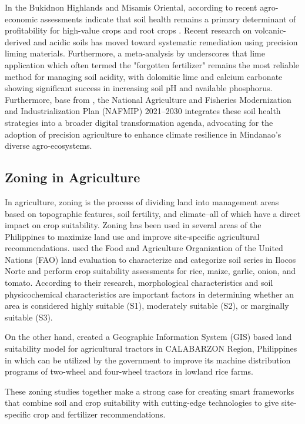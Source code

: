{	In the Bukidnon Highlands and Misamis Oriental, according to \cite{Octavio2024} recent agro-economic assessments indicate that soil health remains a primary determinant of profitability for high-value crops and root crops . Recent research on volcanic-derived and acidic soils has moved toward systematic remediation using precision liming materials. Furthermore, a meta-analysis by \cite{Makaza2026} underscores that lime application which often termed the "forgotten fertilizer" remains the most reliable method for managing soil acidity, with dolomitic lime and calcium carbonate showing significant success in increasing soil pH and available phosphorus. Furthermore, base from \cite{DA2022}, the National Agriculture and Fisheries Modernization and Industrialization Plan (NAFMIP) 2021–2030 integrates these soil health strategies into a broader digital transformation agenda, advocating for the adoption of precision agriculture to enhance climate resilience in Mindanao’s diverse agro-ecosystems.
	
	\subsection{Zoning in Agriculture}
	
	In agriculture, zoning is the process of dividing land into management areas based on topographic features, soil fertility, and climate–all of which have a direct impact on crop suitability. Zoning has been used in several areas of the Philippines to maximize land use and improve site-specific agricultural recommendations. \cite{Watson2025} used the Food and Agriculture Organization of the United Nations (FAO) land evaluation to characterize and categorize soil series in Ilocos Norte and perform crop suitability assessments for rice, maize, garlic, onion, and tomato. According to their research, morphological characteristics and soil physicochemical characteristics are important factors in determining whether an area is considered highly suitable (S1), moderately suitable (S2), or marginally suitable (S3).
	
	On the other hand, \cite{Amongo2023} created a Geographic Information System (GIS) based land suitability model for agricultural tractors in CALABARZON Region, Philippines in which can be utilized by the government to improve its machine distribution programs of two-wheel and four-wheel tractors in lowland rice farms. 
	
	These zoning studies together make a strong case for creating smart frameworks that combine soil and crop suitability with cutting-edge technologies to give site-specific crop and fertilizer recommendations.
	
}
